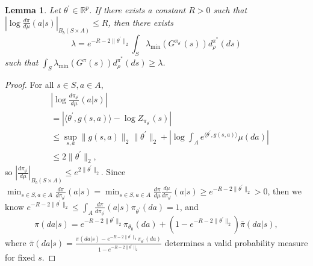 \documentclass{amsart}
\newtheorem{lemma}[theorem]{Lemma}
\theoremstyle{definition}
\begin{document}
\begin{lemma}\label{lemapp:mdp:lower_bound_log_density}
Let $\theta^\prime \in \mathbb{R}^p$.
If there exists a constant $R > 0$ such that $\left|\log \frac{d\pi}{d\mu}(a|s)\right|_{B_b({S \times A})} \leq  R$, then there exists 
\[
\lambda =  e^{-R - 2\|\theta^\prime\|_2} \int_{S}  \lambda_{\min} \left(G^{\pi_{\theta^\prime}}(s) \right)d_\rho^{\pi^*}(ds)
\]
such that $\int_{S} \lambda_{\min} (G^\pi(s))d_\rho^{\pi^*}(ds) \geq \lambda$.
\end{lemma}
\begin{proof}
For all $s \in S, a \in A$,
\begin{align*}
&\left|\log\frac{d \pi_{\theta^\prime}}{d \mu}(a|s)\right|\\
& = \left| \langle \theta^\prime, g(s,a)\rangle - \log Z_{\pi_{\theta^\prime}}(s)\right| \\
& \leq \sup_{s,a}\|g(s,a)\|_2\|\theta^\prime\|_2 + \left|\log \int_{A} e^{\langle \theta^\prime,g(s,a)\rangle}\mu(da)\right|\\
& \leq 2\|\theta^\prime\|_2,
\end{align*}
so $\left|\frac{d \pi_{\theta^\prime}}{d \mu}\right|_{B_b(S \times A)} \leq e^{2\|\theta^\prime\|_2}$.
Since $\min_{s \in S, a\in A} \frac{d\pi}{d\pi_{\theta^\prime}}(a|s) = \min_{s \in S, a\in A} \frac{d\pi}{d\mu} \frac{d\mu}{d \pi_{\theta^\prime}}(a|s) \geq e^{-R - 2\|\theta^\prime\|_2}  > 0$, then we know $e^{-R - 2\|\theta^\prime\|_2}  \leq \int_{A} \frac{d\pi}{d \pi_{\theta^\prime}}(a|s)\pi_{\theta^\prime}(da) = 1$, and
\[
\pi(da|s) = e^{-R - 2\|\theta^\prime\|_2}  \pi_{\theta_{0}}(da) + \left(1-e^{-R - 2\|\theta^\prime\|_2} \right) \bar{\pi}(da|s),
\]
where $\bar{\pi}(da|s) = \frac{\pi(da|s)- e^{-R - 2\|\theta^\prime\|_2} \pi_{\theta^\prime}(da)}{1-e^{-R - 2\|\theta^\prime\|_2} }$ determines a valid probability measure for fixed $s$. 


\end{proof}
\end{document}
